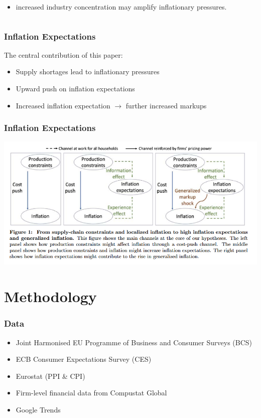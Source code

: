 \documentclass{beamer}
\begin{document}
\begin{spacing}{1.5}
\begin{frame}
\begin{columns}
\begin{column}{0.6\textwidth}
				\cite{brauning2023cost}
					\begin{itemize}
						\item increased industry concentration may amplify inflationary pressures.
					\end{itemize}
				
			\end{column}
		\end{columns}
	\end{frame}
	
	\begin{frame}
		\frametitle{Inflation Expectations}
		The central contribution of this paper:
		\begin{itemize}
			\item Supply shortages lead to inflationary pressures
			\item Upward push on inflation expectations
			\item Increased inflation expectation $\rightarrow$ further increased markups
		\end{itemize}
		
		
	\end{frame}
	
	
	\begin{frame}
		\frametitle{Inflation Expectations}
		\includegraphics[width=\textwidth]{flowchart}
		
	\end{frame}



\section{Methodology}
\begin{frame}
	\frametitle{Data}
	\begin{itemize}
		\item Joint Harmonised EU Programme of Business and Consumer Surveys (BCS)
		\item ECB Consumer Expectations Survey (CES)
		\item Eurostat (PPI \& CPI)
		\item Firm-level financial data from Compustat Global
		\item Google Trends
	\end{itemize}
	

\end{frame}
\end{spacing}
\end{document}
